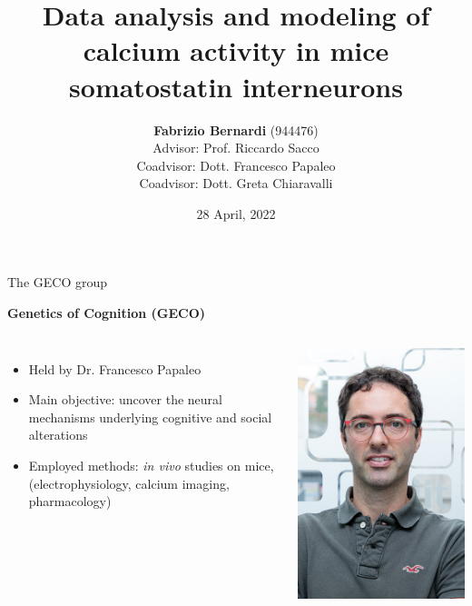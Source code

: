 \documentclass{beamer}
\title{Data analysis and modeling of  calcium activity in   mice somatostatin interneurons}
\author[F. Bernardi]{\textbf{Fabrizio Bernardi} (944476) \\
	Advisor: Prof. Riccardo Sacco \\
	Coadvisor: Dott. Francesco Papaleo \\
	Coadvisor: Dott. Greta Chiaravalli} \medskip
\date[28/04/2022]{28 April, 2022}
\begin{document}
	
	
	\begin{frame}
	\titlepage



\end{frame}

	\begin{frame}{The GECO group}



\textbf{Genetics of Cognition (GECO)}


\begin{columns}
	\begin{itemize}
		\vspace{0.5cm}
		\item Held by Dr. Francesco Papaleo
		
		\vspace{0.5cm}
		
		\item Main objective: uncover the neural mechanisms underlying cognitive and social alterations
		
		\vspace{0.5cm}
		
		\item Employed methods: \textit{in vivo} studies on mice, (electrophysiology, calcium imaging, pharmacology)
		
	\end{itemize}
	\centering
	\includegraphics[scale=0.25]{papaleo}
	
\end{columns}



\end{frame}
\end{document}
